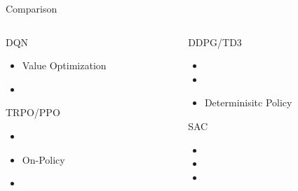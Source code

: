 \begin{frame}{Comparison}
    \begin{columns}[c]
    \begin{column}{0.5\textwidth}
    \begin{block}{DQN}
    \begin{itemize}
        \item \alert{Value Optimization}
        \item \color{ForestGreen}{Off-Policy}
        \vspace{0.25in}
    \end{itemize}
    \end{block}
    \begin{block}{TRPO/PPO}
        \begin{itemize}
            \item \color{ForestGreen}{Policy Optimization}
            \item \alert{On-Policy}
            \item  \color{ForestGreen}{Stochastic Policy}
        \end{itemize}
    \end{block}
    \end{column}
    \begin{column}{0.5\textwidth}
    \begin{block}{DDPG/TD3}
        \begin{itemize}
            \item \color{ForestGreen}{Policy Optimization}
            \item \color{ForestGreen}{Off-Policy}
            \item \alert{Determinisitc Policy}
        \end{itemize}    
    \end{block}
    \begin{block}{SAC}
        \begin{itemize}
            \item \color{ForestGreen}{Policy Optimization}
            \item \color{ForestGreen}{Off-Policy}
            \item \color{ForestGreen}{Stochastic Policy}
        \end{itemize}    
    \end{block}
    \end{column}
    \end{columns}

\end{frame}



